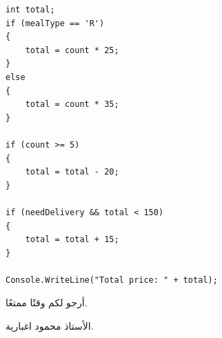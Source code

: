 \documentclass[14pt]{extarticle}
\begin{document}
\begin{enumerate}[resume, itemsep=2.2em]
\begin{boxSolution}
\begin{english}
\begin{verbatim}
int total;
if (mealType == 'R')
{
    total = count * 25;
}
else
{
    total = count * 35;
}

if (count >= 5)
{
    total = total - 20;
}

if (needDelivery && total < 150)
{
    total = total + 15;
}

Console.WriteLine("Total price: " + total);
\end{verbatim}
\end{english}
\end{boxSolution}
\fi
\filbreak

\end{enumerate}

\vspace{1cm}
\begin{flushleft}
أرجو لكم وقتًا ممتعًا.

الأستاذ محمود اغبارية.
\end{flushleft}
\end{document}

